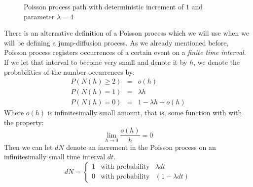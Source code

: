 \documentclass[times, utf8, diplomski]{fer}
\begin{document}
		\begin{figure}[ht]
		\centering
		\caption{Poisson process path with deterministic increment of $1$ and parameter $\lambda = 4$}
	 	\label{fig:poisson_process}
		\end{figure}

		\noindent There is an alternative definition of a Poisson process which we will use when we will be defining a jump-diffusion process. As we already mentioned before, Poisson process registers occurrences of a certain event on a \textit{finite time interval}. If we let that interval to become very small and denote it by $h$, we denote the probabilities of the number occurrences by: 
		$$
			\begin{array}{rcl}
				P(N(h) \geq 2) &\mbox{=}& o(h) \\
				P(N(h) = 1) &\mbox{=}& \lambda h \\
				P(N(h) = 0) &\mbox{=}& 1 - \lambda h + o(h)
			\end{array}
		$$
		Where $o(h)$ is infinitesimally small amount, that is, some function with with the property: $$\lim_{h \to 0} \frac{o(h)}{h} = 0$$ Then we can let $dN$ denote an increment in the Poisson process on an infinitesimally small time interval $dt$. $$ dN = \left\{  \begin{array}{lcl} 1 & \mbox{with probability} & \lambda dt \\
																	0 & \mbox{with probability} & (1 - \lambda dt) \end{array} \right. $$
	
\end{document}
